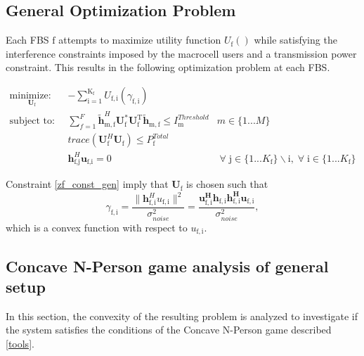 \documentclass[12pt,a4paper]{report}
\begin{document}
\subsection{General Optimization Problem}\label{genproblem}

Each FBS $\text{f}$ attempts to maximize utility function $U_{\text{f}}()$ while satisfying the interference constraints imposed by the macrocell users and a transmission power constraint. This results in the following optimization problem at each FBS.
\par

	\begin{subequations}
	\label{optim}
	\begin{align}
	    \underset{\mathbf{U}_{\mathrm{f}} }{\text{minimize: }} \;
	    & - \sum_{\mathrm{i=1}}^{\mathrm{K_f}}
    	U_{\mathrm{f,i}}(\gamma_{\mathrm{f,i}}) \label{player_opt} \\
	    \text{subject to: } \; &
	   \sum^F_{f=1} \mathbf{\tilde{h}}_{\mathrm{m,f}}^H  \mathbf{U}_{\mathrm{f}}^*		
	\mathbf{U_{\mathrm{f}}^{\mathrm{T}}} \mathbf{\tilde{h}_{\mathrm{m,f}}} \leq I^{Threshold}		
	_{\mathrm{m}} & m \in \{1 ...M\} 
		\label{interference_const_gen}\\
        & trace(\mathbf{U}_{\text{f}}^H\mathbf{U}_{\text{f}}) \leq P^{Total}_{\text{f}} \label{power_const_gen}\\
        & \mathbf{h}_{\text{f,j}}^H\mathbf{u}_{\text{f,i}} =0\ & \; \forall \; \text{j} \in \{1... K_{\text{f}}\}\backslash \text{i} ,\; \forall \; \text{i} \in \{1 ... K_{\text{f}}\} \label{zf_const_gen}
	\end{align}
	\end{subequations}


Constraint \eqref{zf_const_gen} imply that $\mathbf{U}_{\mathrm{f}}$ is chosen such that  
	\begin{equation}\label{zf_snr}
	\gamma_{\mathrm{f,i}} = \frac{\|\mathbf{h}^H_{\mathrm{f,i}}u_{\mathrm{f,i}}\|^2}
	{\sigma^2_{noise}  
	}
	= 
	\frac{\mathbf{u^H_{\mathrm{f,i}}h_{\mathrm{f,i}}h^H_{\mathrm{f,i}}u_{\mathrm{f,i}}}}
	{\sigma^2_{noise}  
	},
	\end{equation}
	which is a convex function with respect to $u_{\mathrm{f,i}}$.
	
\subsection{Concave N-Person game analysis of general setup}
In this section, the convexity of the resulting problem is analyzed to investigate if the system satisfies the conditions of the Concave N-Person game described \ref{tools}. 
\end{document}
